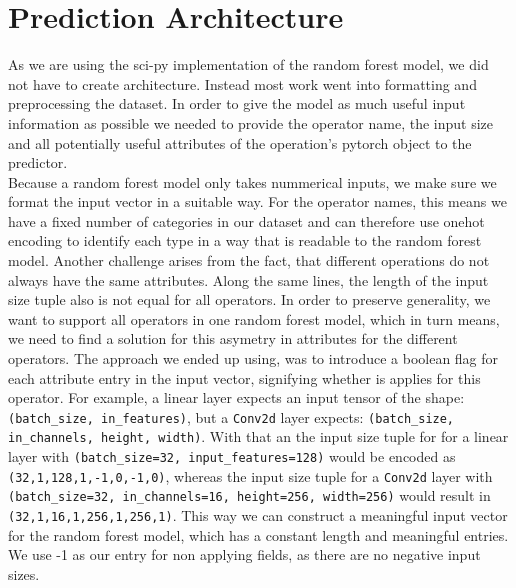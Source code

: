 \section{Prediction Architecture}
As we are using the sci-py implementation of the random forest model, we did not have to create architecture. Instead most work went into formatting and preprocessing the dataset. In order to give the model as much useful input information as possible we needed to provide the operator name, the input size and all potentially useful attributes of the operation's pytorch object to the predictor. \\
Because a random forest model only takes nummerical inputs, we make sure we format the input vector in a suitable way. For the operator names, this means we have a fixed number of categories in our dataset and can therefore use onehot encoding to identify each type in a way that is readable to the random forest model. Another challenge arises from the fact, that different operations do not always have the same attributes. Along the same lines, the length of the input size tuple also is not equal for all operators. In order to preserve generality, we want to support all operators in one random forest model, which in turn means, we need to find a solution for this asymetry in attributes for the different operators. The approach we ended up using, was to introduce a boolean flag for each attribute entry in the input vector, signifying whether is applies for this operator. For example, a linear layer expects an input tensor of the shape: \texttt{(batch\_size, in\_features)}, but a \texttt{Conv2d} layer expects: \texttt{(batch\_size, in\_channels, height, width)}. With that an the input size tuple for for a linear layer with \texttt{(batch\_size=32, input\_features=128)} would be encoded as \texttt{(32,1,128,1,-1,0,-1,0)}, whereas the input size tuple for a \texttt{Conv2d} layer with \texttt{(batch\_size=32, in\_channels=16, height=256, width=256)} would result in \texttt{(32,1,16,1,256,1,256,1)}. This way we can construct a meaningful input vector for the random forest model, which has a constant length and meaningful entries. We use -1 as our entry for non applying fields, as there are no negative input sizes. 